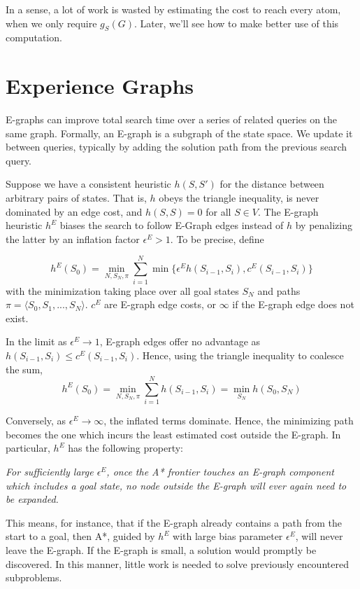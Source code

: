 \documentclass[letterpaper]{article}
\begin{document}
In a sense, a lot of work is wasted by estimating the cost to reach every atom, when we only require $g_S(G)$.
Later, we'll see how to make better use of this computation.

\section{Experience Graphs}

E-graphs can improve total search time over a series of related queries on the same graph.
Formally, an E-graph is a subgraph of the state space.
We update it between queries, typically by adding the solution path from the previous search query.

Suppose we have a consistent heuristic $h(S,S')$ for the distance between arbitrary pairs of states.
That is, $h$ obeys the triangle inequality, is never dominated by an edge cost, and $h(S,S) = 0$ for all $S\in V$.
The E-graph heuristic $h^E$ biases the search to follow E-Graph edges instead of $h$ by penalizing the latter by an inflation factor $\epsilon^E > 1$.
To be precise, define

\[h^E(S_0) = \min_{N,S_N,\pi} \sum_{i=1}^N \min \{\epsilon^E h(S_{i-1},S_i),c^E(S_{i-1},S_i)\}\]
with the minimization taking place over all goal states $S_N$ and paths $\pi = \langle S_0,S_1,...,S_N \rangle$. $c^E$ are E-graph edge costs, or $\infty$ if the E-graph edge does not exist.

In the limit as $\epsilon^E \rightarrow 1$, E-graph edges offer no advantage as $h(S_{i-1},S_i) \le c^E(S_{i-1},S_i)$. Hence, using the triangle inequality to coalesce the sum,
\[h^E(S_0) = \min_{N,S_N,\pi} \sum_{i=1}^N h(S_{i-1},S_i) = \min_{S_N} h(S_0,S_N)\]

Conversely, as $\epsilon^E \rightarrow\infty$, the inflated terms dominate. Hence, the minimizing path becomes the one which incurs the least estimated cost outside the E-graph. In particular, $h^E$ has the following property:

\textit{For sufficiently large $\epsilon^E$, once the A* frontier touches an E-graph component which includes a goal state, no node outside the E-graph will ever again need to be expanded.}

This means, for instance, that if the E-graph already contains a path from the start to a goal, then A*, guided by $h^E$ with large bias parameter $\epsilon^E$, will never leave the E-graph.
If the E-graph is small, a solution would promptly be discovered.
In this manner, little work is needed to solve previously encountered subproblems.
\end{document}
